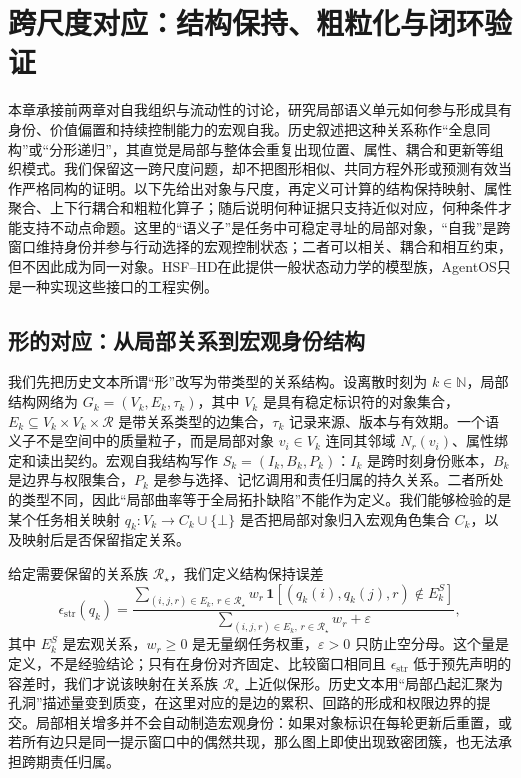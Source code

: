 \chapter{跨尺度对应：结构保持、粗粒化与闭环验证}
\label{chp:holomorphic_isomorphism_ch}
本章承接前两章对自我组织与流动性的讨论，研究局部语义单元如何参与形成具有身份、价值偏置和持续控制能力的宏观自我。历史叙述把这种关系称作“全息同构”或“分形递归”，其直觉是局部与整体会重复出现位置、属性、耦合和更新等组织模式。我们保留这一跨尺度问题，却不把图形相似、共同方程外形或预测有效当作严格同构的证明。以下先给出对象与尺度，再定义可计算的结构保持映射、属性聚合、上下行耦合和粗粒化算子；随后说明何种证据只支持近似对应，何种条件才能支持不动点命题。这里的“语义子”是任务中可稳定寻址的局部对象，“自我”是跨窗口维持身份并参与行动选择的宏观控制状态；二者可以相关、耦合和相互约束，但不因此成为同一对象。HSF--HD在此提供一般状态动力学的模型族，AgentOS只是一种实现这些接口的工程实例。

\section{形的对应：从局部关系到宏观身份结构}
\label{sec:section_5407_1}
我们先把历史文本所谓“形”改写为带类型的关系结构。设离散时刻为 $k\in\mathbb{N}$，局部结构网络为 $G_k=(V_k,E_k,\tau_k)$，其中 $V_k$ 是具有稳定标识符的对象集合，$E_k\subseteq V_k\times V_k\times\mathcal{R}$ 是带关系类型的边集合，$\tau_k$ 记录来源、版本与有效期。一个语义子不是空间中的质量粒子，而是局部对象 $v_i\in V_k$ 连同其邻域 $N_r(v_i)$、属性绑定和读出契约。宏观自我结构写作 $S_k=(I_k,B_k,P_k)$：$I_k$ 是跨时刻身份账本，$B_k$ 是边界与权限集合，$P_k$ 是参与选择、记忆调用和责任归属的持久关系。二者所处的类型不同，因此“局部曲率等于全局拓扑缺陷”不能作为定义。我们能够检验的是某个任务相关映射 $q_k:V_k\rightarrow C_k\cup\{\bot\}$ 是否把局部对象归入宏观角色集合 $C_k$，以及映射后是否保留指定关系。

给定需要保留的关系族 $\mathcal{R}_\star$，我们定义结构保持误差
\[
\epsilon_{\mathrm{str}}(q_k)=
\frac{\sum_{(i,j,r)\in E_k,\,r\in\mathcal{R}_\star}
w_r\,\mathbf{1}\!\left[(q_k(i),q_k(j),r)\notin E_k^{S}\right]}
{\sum_{(i,j,r)\in E_k,\,r\in\mathcal{R}_\star}w_r+\varepsilon},
\]
其中 $E_k^{S}$ 是宏观关系，$w_r\geq0$ 是无量纲任务权重，$\varepsilon>0$ 只防止空分母。这个量是定义，不是经验结论；只有在身份对齐固定、比较窗口相同且 $\epsilon_{\mathrm{str}}$ 低于预先声明的容差时，我们才说该映射在关系族 $\mathcal{R}_\star$ 上近似保形。历史文本用“局部凸起汇聚为孔洞”描述量变到质变，在这里对应的是边的累积、回路的形成和权限边界的提交。局部相关增多并不会自动制造宏观身份：如果对象标识在每轮更新后重置，或若所有边只是同一提示窗口中的偶然共现，那么图上即使出现致密团簇，也无法承担跨期责任归属。


